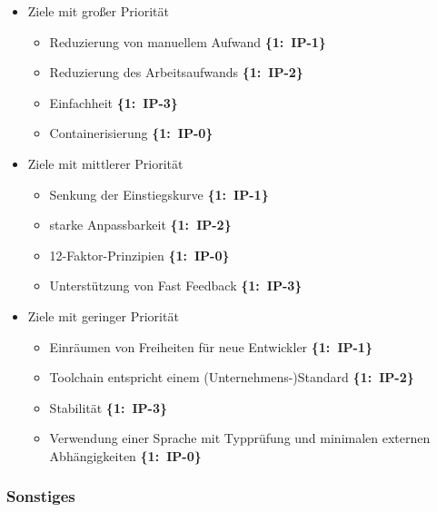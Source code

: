 \begin{flushleft}
    \begin{itemize}
        \item Ziele mit großer Priorität
        \begin{itemize}
            \item Reduzierung von manuellem Aufwand \mbox{\textbf{\{1: IP-1\}}}
            \item Reduzierung des Arbeitsaufwands \mbox{\textbf{\{1: IP-2\}}}
            \item Einfachheit \mbox{\textbf{\{1: IP-3\}}}
            \item Containerisierung \mbox{\textbf{\{1: IP-0\}}}
        \end{itemize}
        \item Ziele mit mittlerer Priorität
        \begin{itemize}
            \item Senkung der Einstiegskurve \mbox{\textbf{\{1: IP-1\}}}
            \item starke Anpassbarkeit \mbox{\textbf{\{1: IP-2\}}}
            \item 12-Faktor-Prinzipien \mbox{\textbf{\{1: IP-0\}}}
            \item Unterstützung von Fast Feedback \mbox{\textbf{\{1: IP-3\}}}
        \end{itemize}
        \item Ziele mit geringer Priorität
        \begin{itemize}
            \item Einräumen von Freiheiten für neue Entwickler \mbox{\textbf{\{1: IP-1\}}}
            \item Toolchain entspricht einem (Unternehmens-)Standard \mbox{\textbf{\{1: IP-2\}}}
            \item Stabilität \mbox{\textbf{\{1: IP-3\}}}
            \item Verwendung einer Sprache mit Typprüfung \linebreak[1] und minimalen externen Abhängigkeiten \mbox{\textbf{\{1: IP-0\}}}
        \end{itemize}
    \end{itemize}
\end{flushleft}

\subsubsection{Sonstiges}
\label{subsubsec:AA-04-04-02_req-gen-miscellaneous}

